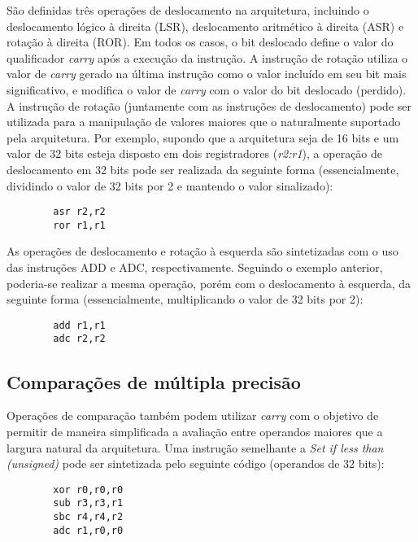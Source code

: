 \documentclass{extreport}
\begin{document}
São definidas três operações de deslocamento na arquitetura, incluindo o deslocamento lógico à direita (LSR), deslocamento aritmético à direita (ASR) e rotação à direita (ROR). Em todos os casos, o bit deslocado define o valor do qualificador \textit{carry} após a execução da instrução. A instrução de rotação utiliza o valor de \textit{carry} gerado na última instrução como o valor incluído em seu bit mais significativo, e modifica o valor de \textit{carry} com o valor do bit deslocado (perdido). A instrução de rotação (juntamente com as instruções de deslocamento) pode ser utilizada para a manipulação de valores maiores que o naturalmente suportado pela arquitetura. Por exemplo, supondo que a arquitetura seja de 16 bits e um valor de 32 bits esteja disposto em dois registradores (\textit{r2:r1}), a operação de deslocamento em 32 bits pode ser realizada da seguinte forma (essencialmente, dividindo o valor de 32 bits por 2 e mantendo o valor sinalizado):

\begin{verbatim}
        asr r2,r2
        ror r1,r1
\end{verbatim}

As operações de deslocamento e rotação à esquerda são sintetizadas com o uso das instruções ADD e ADC, respectivamente. Seguindo o exemplo anterior, poderia-se realizar a mesma operação, porém com o deslocamento à esquerda, da seguinte forma (essencialmente, multiplicando o valor de 32 bits por 2):

\begin{verbatim}
        add r1,r1
        adc r2,r2
\end{verbatim}

\subsection{Comparações de múltipla precisão}

Operações de comparação também podem utilizar \textit{carry} com o objetivo de permitir de maneira simplificada a avaliação entre operandos maiores que a largura natural da arquitetura. Uma instrução semelhante a \textit{Set if less than (unsigned)} pode ser sintetizada pelo seguinte código (operandos de 32 bits):

\begin{verbatim}
        xor r0,r0,r0
        sub r3,r3,r1
        sbc r4,r4,r2
        adc r1,r0,r0
\end{verbatim}
\end{document}
